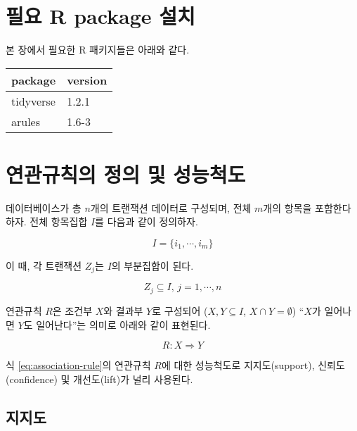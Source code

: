 \documentclass[]{book}
\begin{document}
\hypertarget{association-packages-install}{%
\section{필요 R package 설치}\label{association-packages-install}}

본 장에서 필요한 R 패키지들은 아래와 같다.

\begin{tabular}{l|l}
\hline
package & version\\
\hline
tidyverse & 1.2.1\\
\hline
arules & 1.6-3\\
\hline
\end{tabular}

\hypertarget{association-rule-definition-metric}{%
\section{연관규칙의 정의 및 성능척도}\label{association-rule-definition-metric}}

데이터베이스가 총 \(n\)개의 트랜잭션 데이터로 구성되며, 전체 \(m\)개의 항목을 포함한다 하자. 전체 항목집합 \(I\)를 다음과 같이 정의하자.

\begin{equation*}
I = \{ i_1, \cdots, i_m \}
\end{equation*}

이 때, 각 트랜잭션 \(Z_j\)는 \(I\)의 부분집합이 된다.

\begin{equation*}
Z_j \subseteq I, \, j = 1, \cdots, n
\end{equation*}

연관규칙 \(R\)은 조건부 \(X\)와 결과부 \(Y\)로 구성되어 (\(X, Y \subseteq I\), \(X \cap Y = \emptyset\)) ``\(X\)가 일어나면 \(Y\)도 일어난다''는 의미로 아래와 같이 표현된다.

\begin{equation}
R: X \Rightarrow Y \label{eq:association-rule}
\end{equation}

식 \eqref{eq:association-rule}의 연관규칙 \(R\)에 대한 성능척도로 지지도(support), 신뢰도(confidence) 및 개선도(lift)가 널리 사용된다.

\hypertarget{association-rule-support}{%
\subsection{지지도}\label{association-rule-support}}
\end{document}
